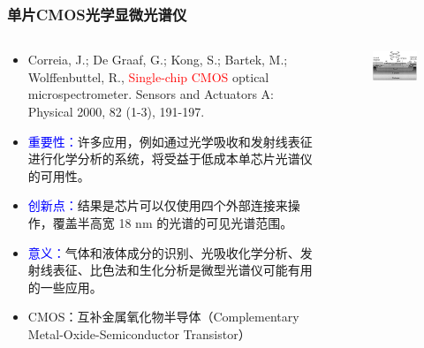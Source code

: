 \begin{frame}[c]
    \frametitle{单片CMOS光学显微光谱仪}
    \begin{columns}
        \begin{column}{.7\textwidth}
            \begin{itemize}
                \item Correia, J.;  De Graaf, G.;  Kong, S.;  Bartek, M.; Wolffenbuttel, R., \textcolor{red}{Single-chip CMOS} optical microspectrometer. Sensors and Actuators A: Physical 2000, 82 (1-3), 191-197.
                \item \textcolor{blue}{重要性：}许多应用，例如通过光学吸收和发射线表征进行化学分析的系统，将受益于低成本单芯片光谱仪的可用性。
                \item \textcolor{blue}{创新点：}结果是芯片可以仅使用四个外部连接来操作，覆盖半高宽 18 nm 的光谱的可见光谱范围。
                \item \textcolor{blue}{意义：}气体和液体成分的识别、光吸收化学分析、发射线表征、比色法和生化分析是微型光谱仪可能有用的一些应用。
                \item \footnotesize{CMOS：互补金属氧化物半导体（Complementary Metal-Oxide-Semiconductor Transistor）}
            \end{itemize}
        \end{column}
        \begin{column}{.3\textwidth}
            \begin{figure}[H] %
                \centering %
                \includegraphics[width=1.\textwidth]{figures/Single-chip CMOS optical microspectrometer_1.jpg} %

\end{figure}
\end{column}
\end{columns}
\end{frame}

